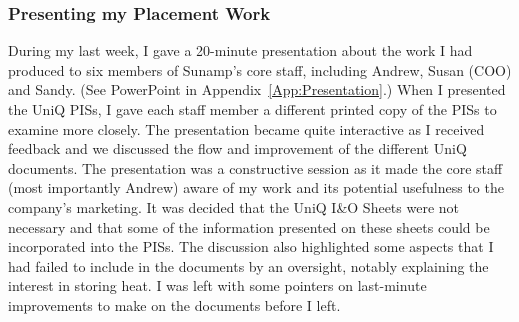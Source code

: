 




\subsubsection{Presenting my Placement Work}

During my last week, I gave a 20-minute presentation about the work I had produced to six members of Sunamp's core staff, including Andrew, Susan (COO) and Sandy.
(See PowerPoint in Appendix~\ref{App:Presentation}.)
When I presented the UniQ PISs, I gave each staff member a different printed copy of the PISs to examine more closely.
The presentation became quite interactive as I received feedback and we discussed the flow and improvement of the different UniQ documents.
The presentation was a constructive session as it made the core staff (most importantly Andrew) aware of my work and its potential usefulness to the company's marketing.
It was decided that the UniQ I\&O Sheets were not necessary and that some of the information presented on these sheets could be incorporated into the PISs.
The discussion also highlighted some aspects that I had failed to include in the documents by an oversight, notably explaining the interest in storing heat.
I was left with some pointers on last-minute improvements to make on the documents before I left.




